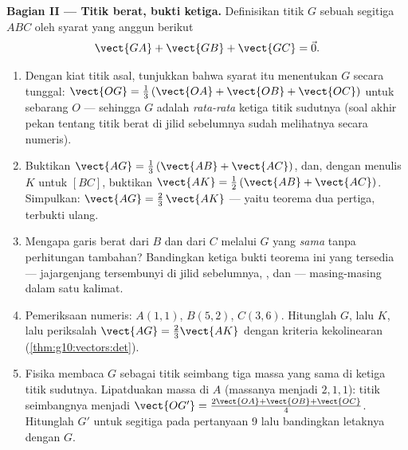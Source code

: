 \begin{problem}
\medskip
\noindent\textbf{Bagian II --- Titik berat, bukti ketiga.}
Definisikan titik $G$ sebuah segitiga $ABC$ oleh syarat yang
anggun berikut
\[
\vect{GA} + \vect{GB} + \vect{GC} = \vec 0 .
\]
\begin{enumerate}[resume]
  \item Dengan kiat titik asal, tunjukkan bahwa syarat itu
        menentukan $G$ secara tunggal:
        $\vect{OG} = \frac13\left(\vect{OA} + \vect{OB} +
        \vect{OC}\right)$ untuk sebarang $O$ --- sehingga 
        $G$ adalah \emph{rata-rata}  ketiga titik sudutnya
        (soal akhir pekan tentang titik berat di jilid sebelumnya sudah
        melihatnya secara numeris).
  \item Buktikan $\vect{AG} = \frac13\left(\vect{AB} +
        \vect{AC}\right)$, dan, dengan menulis $K$ untuk 
        $[BC]$, buktikan $\vect{AK} = \frac12\left(\vect{AB} +
        \vect{AC}\right)$. Simpulkan:
        $\vect{AG} = \frac23\,\vect{AK}$ --- yaitu teorema dua
        pertiga, terbukti ulang.
  \item Mengapa garis berat dari $B$ dan dari $C$ melalui
        $G$ yang \emph{sama} tanpa perhitungan tambahan?
        Bandingkan ketiga bukti teorema ini yang tersedia ---
        jajargenjang tersembunyi di jilid sebelumnya, , dan 
        --- masing-masing dalam satu kalimat.
  \item Pemeriksaan numeris: $A(1, 1)$, $B(5, 2)$, $C(3, 6)$.
        Hitunglah $G$, lalu $K$, lalu periksalah
        $\vect{AG} = \frac23 \vect{AK}$ dengan kriteria
        kekolinearan (\cref{thm:g10:vectors:det}).
  \item Fisika membaca $G$ sebagai titik seimbang tiga massa
        yang sama di ketiga titik sudutnya. Lipatduakan massa di $A$ (massanya
        menjadi $2, 1, 1$): titik seimbangnya menjadi
        $\vect{OG'} = \frac{2\vect{OA} + \vect{OB} +
        \vect{OC}}{4}$. Hitunglah $G'$ untuk segitiga pada
        pertanyaan 9 lalu bandingkan letaknya dengan $G$.
\end{enumerate}


\end{problem}
